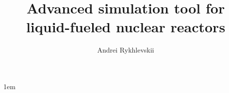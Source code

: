 \documentclass[tocnosub,noragright,centerchapter,12pt,fullpage]{uiucecethesis09}
\title{Advanced simulation tool for liquid-fueled nuclear reactors}
\author{Andrei Rykhlevskii}
\begin{document}

%
\maketitle

\parindent 1em%

\frontmatter

%
\begin{abstract}

\end{abstract}

%

%
%
%
\tableofcontents

%

%

%
\end{document}
